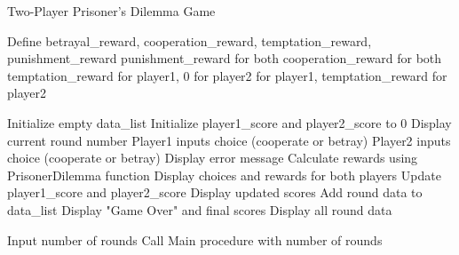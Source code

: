 \documentclass{article}
\begin{document}
\begin{algorithm}
\caption{Two-Player Prisoner's Dilemma Game}
\begin{algorithmic}[1]

    \State Define betrayal\_reward, cooperation\_reward, temptation\_reward, punishment\_reward
        \State \Return punishment\_reward for both
        \State \Return cooperation\_reward for both
        \State \Return temptation\_reward for player1, 0 for player2
        \State {} for player1, temptation\_reward for player2
    \EndIf
\EndProcedure

    \State Initialize empty data\_list
    \State Initialize player1\_score and player2\_score to 0
        \State Display current round number
        \State Player1 inputs choice (cooperate or betray)
        \State Player2 inputs choice (cooperate or betray)
            \State Display error message
            \State \Return
        \EndIf
        \State Calculate rewards using PrisonerDilemma function
        \State Display choices and rewards for both players
        \State Update player1\_score and player2\_score
        \State Display updated scores
        \State Add round data to data\_list
    \EndFor
    \State Display "Game Over" and final scores
    \State Display all round data
\EndProcedure

    \State Input number of rounds
    \State Call Main procedure with number of rounds
\EndProcedure

\end{algorithmic}
\end{algorithm}
\end{document}

